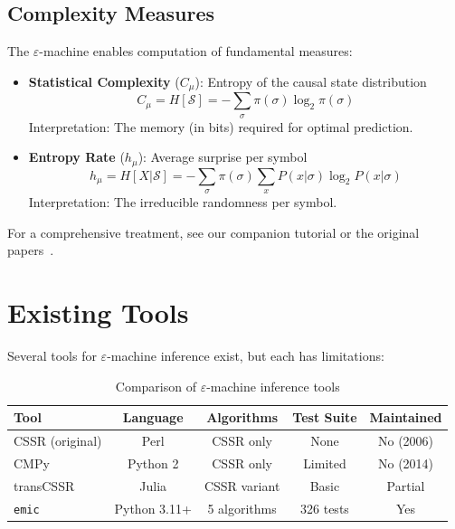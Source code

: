 \documentclass[11pt,a4paper]{report}
\theoremstyle{definition}
\theoremstyle{plain}
\newcommand{\eps}{\varepsilon}
\newcommand{\Cmu}{C_\mu}
\newcommand{\hmu}{h_\mu}
\newcommand{\calS}{\mathcal{S}}
\newcommand{\emic}{\texttt{emic}}
\begin{document}
\subsection{Complexity Measures}

The $\eps$-machine enables computation of fundamental measures:

\begin{itemize}
    \item \textbf{Statistical Complexity} ($\Cmu$): Entropy of the causal state distribution
    \begin{equation}
        \Cmu = H[\calS] = -\sum_{\sigma} \pi(\sigma) \log_2 \pi(\sigma)
    \end{equation}
    Interpretation: The memory (in bits) required for optimal prediction.

    \item \textbf{Entropy Rate} ($\hmu$): Average surprise per symbol
    \begin{equation}
        \hmu = H[X | \calS] = -\sum_{\sigma} \pi(\sigma) \sum_x P(x|\sigma) \log_2 P(x|\sigma)
    \end{equation}
    Interpretation: The irreducible randomness per symbol.
\end{itemize}

For a comprehensive treatment, see our companion tutorial or the original papers~\cite{shalizi2001computational,crutchfield2012between}.

\section{Existing Tools}

Several tools for $\eps$-machine inference exist, but each has limitations:

\begin{table}[h]
\centering
\caption{Comparison of $\eps$-machine inference tools}
\label{tab:tools}
\begin{tabular}{lcccc}
\toprule
Tool & Language & Algorithms & Test Suite & Maintained \\
\midrule
CSSR (original) & Perl & CSSR only & None & No (2006) \\
CMPy & Python 2 & CSSR only & Limited & No (2014) \\
transCSSR & Julia & CSSR variant & Basic & Partial \\
\emic{} & Python 3.11+ & 5 algorithms & 326 tests & Yes \\
\bottomrule
\end{tabular}
\end{table}
\end{document}
